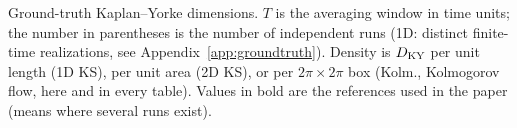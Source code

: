 \begin{table}[htbp]
\caption{Ground-truth Kaplan--Yorke dimensions. $T$ is the averaging
window in time units; the number in parentheses is the number of
independent runs (1D: distinct finite-time realizations, see
Appendix~\ref{app:groundtruth}). Density is $\DKY$ per unit length (1D KS), per unit area
(2D KS), or per $2\pi\times2\pi$ box (Kolm., Kolmogorov flow, here and in
every table). Values in bold are the
references used in the paper (means where several runs exist).}
\label{tab:truth}
\end{table}
